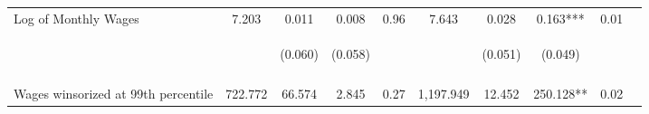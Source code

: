 \begin{tabular}{lccccccccc}
\noalign{\smallskip}Log of Monthly Wages & 7.203 & 0.011 & 0.008 & 0.96 & 7.643 & 0.028 & 0.163*** & 0.01 & \\
 & \begin{footnotesize}\end{footnotesize} & \begin{footnotesize}(0.060)\end{footnotesize} & \begin{footnotesize}(0.058)\end{footnotesize} & \begin{footnotesize}\end{footnotesize} & \begin{footnotesize}\end{footnotesize} & \begin{footnotesize}(0.051)\end{footnotesize} & \begin{footnotesize}(0.049)\end{footnotesize} & \begin{footnotesize}\end{footnotesize} & \begin{footnotesize}\end{footnotesize}\\
 & \begin{footnotesize}\end{footnotesize} & \begin{footnotesize}[0.612]\end{footnotesize} & \begin{footnotesize}[1.000]\end{footnotesize} & \begin{footnotesize}\end{footnotesize} & \begin{footnotesize}\end{footnotesize} & \begin{footnotesize}[1.000]\end{footnotesize} & \begin{footnotesize}[0.006]\end{footnotesize} & \begin{footnotesize}\end{footnotesize} & \begin{footnotesize}\end{footnotesize}\\
\noalign{\smallskip}Wages winsorized at 99th percentile & 722.772 & 66.574 & 2.845 & 0.27 & 1,197.949 & 12.452 & 250.128** & 0.02 & \\

\end{tabular}
